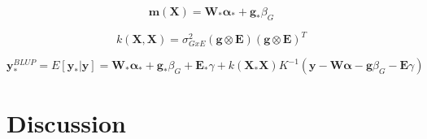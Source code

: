 \begin{equation}
    \mathbf{m}(\mathbf{X}) = \mathbf{W}_*\boldsymbol{\alpha}_{*}+\mathbf{g}_*\beta_G
\end{equation}

\begin{equation}
    k(\mathbf{X},\mathbf{X}) = \sigma_{GxE}^2(\mathbf{g}\otimes\mathbf{E})(\mathbf{g}\otimes\mathbf{E})^T
\end{equation}

\begin{equation}
\mathbf{y}_{*}^{BLUP} = E[\mathbf{y}_*|\mathbf{y}] = 
\mathbf{W}_*\boldsymbol{\alpha}_{*}+\mathbf{g}_*\beta_G+\mathbf{E}_*\gamma + 
k(\mathbf{X}_*\mathbf{X})K^{-1}(\mathbf{y}-\mathbf{W}\boldsymbol{\alpha}-\mathbf{g}\beta_G-\mathbf{E}\gamma)
\end{equation}

\section{Discussion}